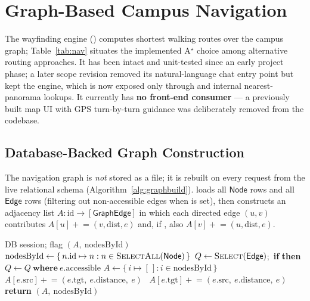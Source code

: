 \section{Graph-Based Campus Navigation}
\label{sec:nav}



The wayfinding engine () computes shortest
walking routes over the campus graph; Table~\ref{tab:nav} situates the
implemented A$^{\star}$ choice among alternative routing approaches. It has
been intact and unit-tested since an early project phase; a later scope
revision removed its natural-language chat entry point but kept the engine,
which is now exposed only through  and internal
nearest-panorama lookups. It currently has \textbf{no front-end consumer} --- a
previously built map UI with GPS turn-by-turn guidance was deliberately
removed from the codebase.

\subsection{Database-Backed Graph Construction}
The navigation graph is \emph{not} stored as a file; it is rebuilt on every
request from the live relational schema (Algorithm~\ref{alg:graphbuild}).
 loads all $\textsf{Node}$ rows and all $\textsf{Edge}$
rows (filtering out non-accessible edges when  is
set), then constructs an adjacency list $A: \mathrm{id} \to
[\textsf{GraphEdge}]$ in which each directed edge $(u,v)$ contributes
$A[u] \mathrel{+}= (v, \text{dist}, e)$ and, if
, also $A[v] \mathrel{+}= (u, \text{dist}, e)$.

\begin{algorithm}[!t]
\caption{Database-Backed Graph Construction}
\label{alg:graphbuild}
\begin{algorithmic}[1]
\Require DB session; flag 
\Ensure {}$(A,\ \text{nodesById})$
\State $\text{nodesById} \gets \{\, n.\text{id} \mapsto n : n \in \textsc{SelectAll}(\textsf{Node}) \,\}$
\State $Q \gets \textsc{Select}(\textsf{Edge})$;\ \textbf{if}  \textbf{then} $Q \gets Q\ \textbf{where}\ e.\text{accessible}$
\State $A \gets \{\, i \mapsto [\,] : i \in \text{nodesById} \,\}$
  \State $A[e.\text{src}] \mathrel{+}= (e.\text{tgt},\ e.\text{distance},\ e)$
  \ $A[e.\text{tgt}] \mathrel{+}= (e.\text{src},\ e.\text{distance},\ e)$ \EndIf
\EndFor
\State \textbf{return} $(A,\ \text{nodesById})$
\end{algorithmic}
\end{algorithm}

